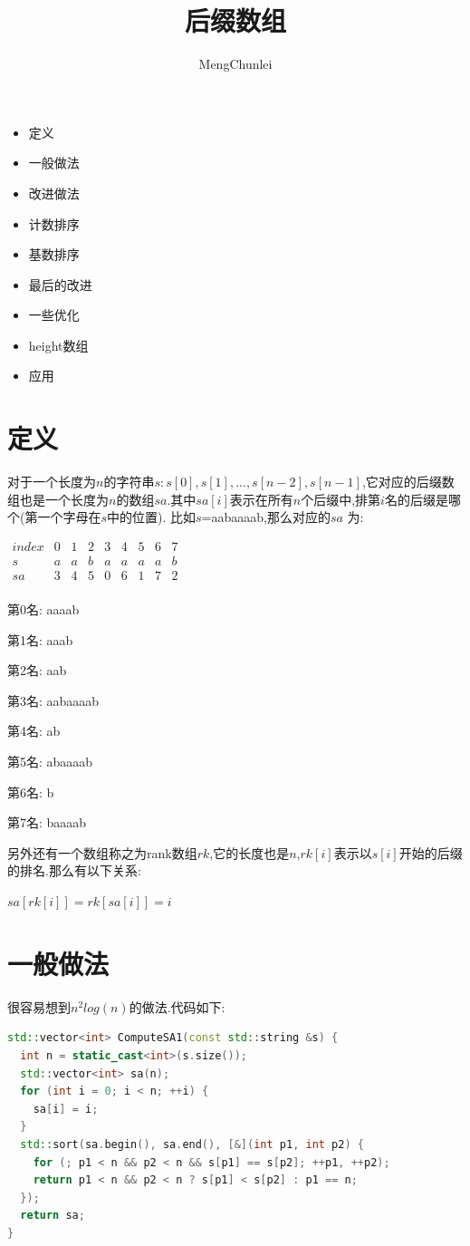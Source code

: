 \documentclass{article}
\title{后缀数组}
\author{MengChunlei}
\begin{document}
\maketitle
\begin{itemize}
	\item 定义
	\item 一般做法
	\item 改进做法
	\item 计数排序
	\item 基数排序
	\item 最后的改进
	\item 一些优化
	\item height数组
	\item 应用
\end{itemize}
\section{定义}
对于一个长度为$n$的字符串$s:s[0],s[1],...,s[n-2],s[n-1]$,它对应的后缀数组也是一个长度为$n$的数组$sa$.其中$sa[i]$表示在所有$n$个后缀中,排第$i$名的后缀是哪个(第一个字母在$s$中的位置).
比如$s$=aabaaaab,那么对应的$sa$ 为: \par
$\begin{matrix} 
index & 0 & 1 & 2 & 3 & 4 & 5 & 6 & 7 \\ 
s & a & a & b & a & a & a & a & b \\ 
sa & 3 & 4 & 5 & 0 & 6 & 1 & 7 & 2 \\
\end{matrix}$ \par
第0名: aaaab\par
第1名: aaab\par
第2名: aab\par
第3名: aabaaaab\par
第4名: ab\par
第5名: abaaaab\par
第6名: b\par
第7名: baaaab\par
另外还有一个数组称之为rank数组$rk$,它的长度也是$n$,$rk[i]$表示以$s[i]$开始的后缀的排名.那么有以下关系: \par
$sa[rk[i]]=rk[sa[i]]=i$ \par
\section{一般做法}
很容易想到$n^{2}log(n)$的做法.代码如下: \par
\begin{lstlisting}[language=C++, caption={Normal}]
std::vector<int> ComputeSA1(const std::string &s) {
  int n = static_cast<int>(s.size());
  std::vector<int> sa(n);
  for (int i = 0; i < n; ++i) {
    sa[i] = i;
  }
  std::sort(sa.begin(), sa.end(), [&](int p1, int p2) {
    for (; p1 < n && p2 < n && s[p1] == s[p2]; ++p1, ++p2);
    return p1 < n && p2 < n ? s[p1] < s[p2] : p1 == n;
  });
  return sa;
}
\end{lstlisting}
\end{document}
